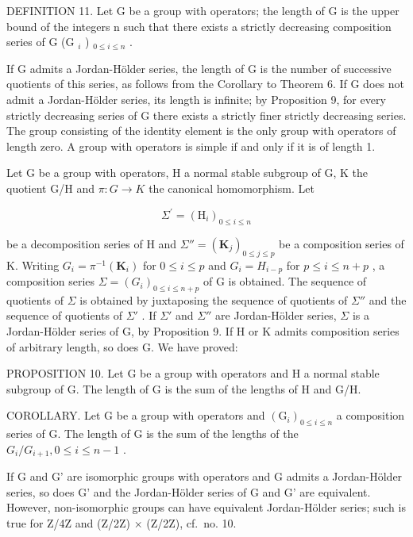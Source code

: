 DEFINITION 11. Let G be a group with operators; the length of G is the upper bound of the integers n such that there exists a strictly decreasing composition series of G (G \(_{i}\) ) \(_{0 \leq i \leq n}\) .

If G admits a Jordan-Hölder series, the length of G is the number of successive quotients of this series, as follows from the Corollary to Theorem 6. If G does not admit a Jordan-Hölder series, its length is infinite; by Proposition 9, for every strictly decreasing series of G there exists a strictly finer strictly decreasing series. The group consisting of the identity element is the only group with operators of length zero. A group with operators is simple if and only if it is of length 1.

Let G be a group with operators, H a normal stable subgroup of G, K the quotient G/H and \(\pi: G \rightarrow K\) the canonical homomorphism. Let

\[
\Sigma^ {\prime} = \left(\mathrm{H} _ {i}\right) _ {0 \leqslant i \leqslant n}
\]

be a decomposition series of H and \(\Sigma'' = (\mathbf{K}_j)_{0 \leqslant j \leqslant p}\) be a composition series of K. Writing \(G_i = \pi^{-1}(\mathbf{K}_i)\) for \(0 \leqslant i \leqslant p\) and \(G_i = H_{i-p}\) for \(p \leqslant i \leqslant n + p\) , a composition series \(\Sigma = (G_i)_{0 \leqslant i \leqslant n+p}\) of G is obtained. The sequence of quotients of \(\Sigma\) is obtained by juxtaposing the sequence of quotients of \(\Sigma''\) and the sequence of quotients of \(\Sigma'\) . If \(\Sigma'\) and \(\Sigma''\) are Jordan-Hölder series, \(\Sigma\) is a Jordan-Hölder series of G, by Proposition 9. If H or K admits composition series of arbitrary length, so does G. We have proved:

PROPOSITION 10. Let G be a group with operators and H a normal stable subgroup of G. The length of G is the sum of the lengths of H and G/H.

COROLLARY. Let G be a group with operators and \((\mathrm{G}_{i})_{0\leqslant i\leqslant n}\) a composition series of G. The length of G is the sum of the lengths of the \(G_{i}/G_{i+1}, 0 \leqslant i \leqslant n - 1\) .

If G and G' are isomorphic groups with operators and G admits a Jordan-Hölder series, so does G' and the Jordan-Hölder series of G and G' are equivalent. However, non-isomorphic groups can have equivalent Jordan-Hölder series; such is true for Z/4Z and (Z/2Z) × (Z/2Z), cf.~no. 10.

